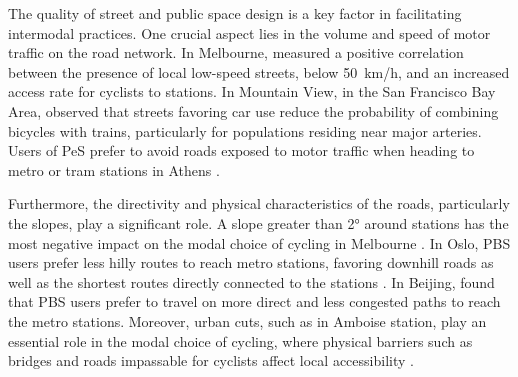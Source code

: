 \begin{refsegment}
The quality of street and public space design is a key factor in facilitating intermodal practices. One crucial aspect lies in the volume and speed of motor traffic on the road network. In Melbourne, \textcolor{blue}{\textcite[403]{weliwitiya_bicycle_2019}} measured a positive correlation between the presence of local low-speed streets, below 50~km/h, and an increased access rate for cyclists to stations. In Mountain View, in the San Francisco Bay Area, \textcolor{blue}{\textcite[656]{park_finding_2014}} observed that streets favoring car use reduce the probability of combining bicycles with trains, particularly for populations residing near major arteries. Users of \acrshort{PeS} prefer to avoid roads exposed to motor traffic when heading to metro or tram stations in Athens \textcolor{blue}{\autocite[10]{tzouras_describing_2023}}.%

Furthermore, the directivity and physical characteristics of the roads, particularly the slopes, play a significant role. A slope greater than 2° around stations has the most negative impact on the modal choice of cycling in Melbourne \textcolor{blue}{\autocite[403]{weliwitiya_bicycle_2019}}. In Oslo, \acrshort{PBS} users prefer less hilly routes to reach metro stations, favoring downhill roads as well as the shortest routes directly connected to the stations \textcolor{blue}{\autocite[394]{bocker_bike_2020}}. In Beijing, \textcolor{blue}{\textcite[10]{zhao_public_2022}} found that \acrshort{PBS} users prefer to travel on more direct and less congested paths to reach the metro stations. Moreover, urban cuts, such as in Amboise station, play an essential role in the modal choice of cycling, where physical barriers such as bridges and roads impassable for cyclists affect local accessibility \textcolor{blue}{\autocite[88]{papon_rapport_2015}}.%


\end{refsegment}
